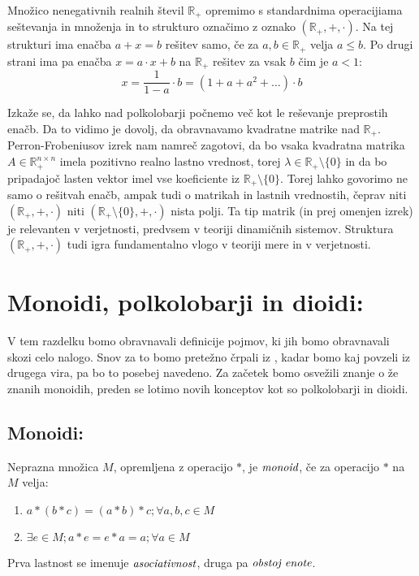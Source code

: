 \documentclass[mat1]{fmfdelo}
\newcommand{\Pplus}[1]{\mathbb{#1}_{+}}
\newcommand{\pojem}[1]{\ensuremath{\emph{#1}}}
\begin{document}
\begin{zgled}
	Množico nenegativnih realnih števil $\Pplus{R}$ opremimo s standardnima operacijiama seštevanja in množenja in to strukturo označimo z oznako $(\Pplus{R}, +, \cdot)$. Na tej strukturi ima enačba $a + x = b$ rešitev samo, če za $a, b\in\Pplus{R}$ velja $a\leq b$. Po drugi strani ima pa enačba $x = a\cdot x + b$ na $\Pplus{R}$ rešitev za vsak $b$ čim je $a < 1$: $$ x = \frac{1}{1 - a} \cdot b = (1 + a + a^2 + \ldots)\cdot b$$
\end{zgled}
Izkaže se, da lahko nad polkolobarji počnemo več kot le reševanje preprostih enačb. Da to vidimo je dovolj, da obravnavamo kvadratne matrike nad $\Pplus{R}$. Perron-Frobeniusov izrek nam namreč zagotovi, da bo vsaka kvadratna matrika $A \in\Pplus{R}^{n\times n}$ imela pozitivno realno lastno vrednost, torej $\lambda\in\Pplus{R}\setminus\{0\}$ in da bo pripadajoč lasten vektor imel vse koeficiente iz $\Pplus{R}\setminus\{0\}$. Torej lahko govorimo ne samo o rešitvah enačb, ampak tudi o matrikah in lastnih vrednostih, čeprav niti $(\Pplus{R}, +, \cdot)$ niti $(\Pplus{R}\setminus\{0\}, +, \cdot)$ nista polji. Ta tip matrik (in prej omenjen izrek) je relevanten v verjetnosti, predvsem v teoriji dinamičnih sistemov. Struktura $(\Pplus{R}, +, \cdot)$ tudi igra fundamentalno vlogo v teoriji mere in v verjetnosti.

\section{Monoidi, polkolobarji in dioidi:}
V tem razdelku bomo obravnavali definicije pojmov, ki jih bomo obravnavali skozi celo nalogo. Snov za to bomo pretežno črpali iz \cite[Poglavje 1]{bib:Gondran}, kadar bomo kaj povzeli iz drugega vira, pa bo to posebej navedeno. Za začetek bomo osvežili znanje o že znanih monoidih, preden se lotimo novih konceptov kot so polkolobarji in dioidi. 
\subsection{Monoidi:}
\begin{definicija}
	Neprazna množica $M$, opremljena z operacijo $\ast$, je \pojem{monoid}, če za operacijo $\ast$ na $M$ velja:
	\begin{enumerate}
		\item $a \ast (b \ast c) = (a\ast b) \ast c;\forall a, b, c \in M$
		\item $\exists e\in M; a \ast e = e\ast a = a;\forall a\in M$
	\end{enumerate}
	Prva lastnost se imenuje \pojem{asociativnost}, druga pa \pojem{obstoj enote}. 
\end{definicija}
\end{document}
